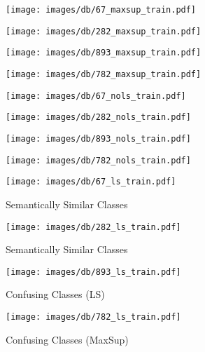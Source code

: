 \begin{figure*}[ht]
\captionsetup{font=footnotesize,labelfont=footnotesize}
    \centering
    \begin{subfigure}[b]{0.245\textwidth}
        \texttt{[image: images/db/67\_maxsup\_train.pdf]}
    \end{subfigure}
    \begin{subfigure}[b]{0.245\textwidth}
        \texttt{[image: images/db/282\_maxsup\_train.pdf]}
    \end{subfigure}
    \begin{subfigure}[b]{0.245\textwidth}
        \texttt{[image: images/db/893\_maxsup\_train.pdf]}
    \end{subfigure}
    \begin{subfigure}[b]{0.245\textwidth}
        \texttt{[image: images/db/782\_maxsup\_train.pdf]}
    \end{subfigure}
    \centering
    \begin{subfigure}[b]{0.245\textwidth}
        \texttt{[image: images/db/67\_nols\_train.pdf]}
    \end{subfigure}
    \begin{subfigure}[b]{0.245\textwidth}
        \texttt{[image: images/db/282\_nols\_train.pdf]}
    \end{subfigure}
    \begin{subfigure}[b]{0.245\textwidth}
        \texttt{[image: images/db/893\_nols\_train.pdf]}
    \end{subfigure}
    \begin{subfigure}[b]{0.245\textwidth}
        \texttt{[image: images/db/782\_nols\_train.pdf]}
    \end{subfigure}
    \begin{subfigure}[b]{0.245\textwidth}    \texttt{[image: images/db/67\_ls\_train.pdf]}
        \caption{Semantically Similar Classes}
        \label{bd_a1}
    \end{subfigure}
    \begin{subfigure}[b]{0.245\textwidth}     \texttt{[image: images/db/282\_ls\_train.pdf]}
        \caption{Semantically Similar Classes}
        \label{bd_b1}
    \end{subfigure}
    \begin{subfigure}[b]{0.245\textwidth}     \texttt{[image: images/db/893\_ls\_train.pdf]}
        \caption{Confusing Classes (LS)}
        \label{bd_c1}
    \end{subfigure}
    \begin{subfigure}[b]{0.245\textwidth}      \texttt{[image: images/db/782\_ls\_train.pdf]}
        \caption{Confusing Classes (MaxSup)}
        \label{bd_d1}
    \end{subfigure}
    


\end{figure*}
